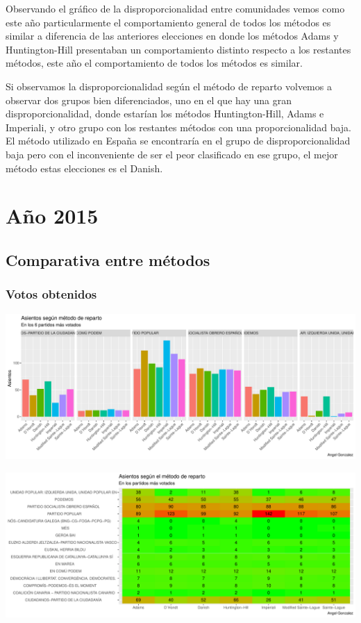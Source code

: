 \documentclass[12pt,a4paper,]{book}
\numberwithin{dummy}{section}
\theoremstyle{ocrenumbox}
\theoremstyle{blacknumex}
\theoremstyle{blacknumbox}
\theoremstyle{ocrenum}
\theoremstyle{ocrenum}
\begin{document}
Observando el gráfico de la disproporcionalidad entre comunidades vemos
como este año particularmente el comportamiento general de todos los
métodos es similar a diferencia de las anteriores elecciones en donde
los métodos Adams y Huntington-Hill presentaban un comportamiento
distinto respecto a los restantes métodos, este año el comportamiento de
todos los métodos es similar.

Si observamos la disproporcionalidad según el método de reparto volvemos
a observar dos grupos bien diferenciados, uno en el que hay una gran
disproporcionalidad, donde estarían los métodos Huntington-Hill, Adams e
Imperiali, y otro grupo con los restantes métodos con una
proporcionalidad baja. El método utilizado en España se encontraría en
el grupo de disproporcionalidad baja pero con el inconveniente de ser el
peor clasificado en ese grupo, el mejor método estas elecciones es el
Danish.

\hypertarget{auxf1o-2015}{%
\section{Año 2015}\label{auxf1o-2015}}

\hypertarget{comparativa-entre-muxe9todos-11}{%
\subsection{Comparativa entre
métodos}\label{comparativa-entre-muxe9todos-11}}

\hypertarget{votos-obtenidos-11}{%
\subsubsection{Votos obtenidos}\label{votos-obtenidos-11}}

\begin{center}\includegraphics[width=0.95\linewidth]{figurasR/unnamed-chunk-158-1} \end{center}

\begin{center}\includegraphics[width=0.95\linewidth]{figurasR/unnamed-chunk-158-2} \end{center}
\end{document}
